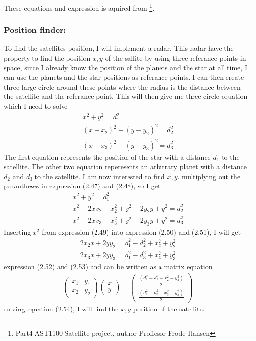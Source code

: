 \documentclass[a4paper,11pt,english]{report}
\begin{document}
These equations and expression is aquired from 
\footnote{Part4 AST1100 Satellite project, author Proffesor Frode
  Hansen}. 

\subsubsection{Position finder:} To find the satellites position, I will
implement a radar. This radar have the property to find the position \(x,y\) of the
sallite by using three referance points in space, since I already know the position
of the planets and the star at all time, I can use the planets and the star
positions as referance points. I can then create three  large circle around these
points where the radius is the distance between the satellite and the referance
point.
This will then give me three circle equation which I need to solve
\begin{align}
  x^{2} + y^{2} = d_{1}^{2}
  \\
  (x- x_{2})^{2} + (y - y_{2})^{2} = d_{2}^{2}
  \\
  (x - x_{3})^{2} + (y - y_{3})^{2} = d_{3}^{2}
\end{align}
The first equation represents the position of the star with a distance
\(d_{1}\) to the satellite. The other two equation reperesents an arbitrary
planet with a distance \(d_{2}\) and \(d_{3}\) to the satellite. I am now
interested to find \(x,y\).  multiplying out the parantheses in expression
(2.47) and (2.48),  so I get
\begin{align}
  x^{2} + y^{2} = d_{1}^{2}
  \\
  x^{2} - 2xx_{2} + x_{2}^{2} + y^{2} - 2y_{2}y + y^{2} = d_{2}^{2}
  \\
  x^{2} - 2xx_{3} + x_{3}^{2} + y^{2} - 2y_{3}y + y^{2} = d_{3}^{2}
\end{align}
Inserting \(x^{2}\) from expression (2.49) into expression (2.50) and (2.51), I
will get
\begin{align}
  2x_{2}x + 2yy_{2} = d_{1}^{2} - d_{2}^{2} + x_{2}^{2} + y_{2}^{2}
  \\
  2x_{3}x + 2yy_{3} = d_{1}^{2} - d_{3}^{2} + x_{3}^{2} + y_{3}^{2}
\end{align}
expression (2.52) and (2.53) and can be written as a matrix equation
\begin{align}
  \begin{pmatrix}
    x_{1} & y_{1}
    \\
    x_{2} & y_{2}
  \end{pmatrix}
            \begin{pmatrix}
              x
              \\
              y
            \end{pmatrix}
  =
  \begin{pmatrix}
    \frac{(d_{1}^{2} - d_{2}^{2} + x_{2}^{2} + y_{2}^{2})}{2} \\
    \frac{(d_{1}^{2} - d_{3}^{2} + x_{3}^{2} + y_{3}^{2})}{2} 
  \end{pmatrix}
\end{align}
solving equation (2.54), I will find the \(x,y\) position of the satellite.
\end{document}

